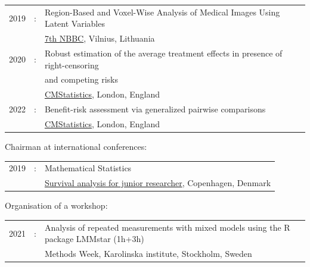 \documentclass[12pt]{article}
\begin{document}
\begin{tabular}{l@{ }l@{ }l}
2019 &:& Region-Based and Voxel-Wise Analysis of Medical Images Using Latent Variables \\
&& \href{https://events.razzby.com/nbbc19/}{7th NBBC}, Vilnius, Lithuania \\
2020 &:& Robust estimation of the average treatment effects in presence of right-censoring \\
&& and competing risks \\
&& \href{http://www.cmstatistics.org/conferences.php}{CMStatistics}, London, England \\
2022 &:&  	Benefit-risk assessment via generalized pairwise comparisons  \\
&& \href{http://www.cmstatistics.org/CMStatistics2022/programme.php}{CMStatistics}, London, England \\
\end{tabular}

\bigskip

Chairman at international conferences:

\medskip

\begin{tabular}{l@{ }l@{ }l}
2019 &:& Mathematical Statistics \\
&& \href{https://publicifsv.sund.ku.dk/~safjr2019/}{Survival analysis for junior researcher}, Copenhagen, Denmark
\end{tabular}

\bigskip

Organisation of a workshop:
\begin{tabular}{l@{ }l@{ }l}
2021 &:& Analysis of repeated measurements with mixed models using the R package LMMstar (1h+3h) \\
&& Methods Week, Karolinska institute, Stockholm, Sweden
\end{tabular}



\end{document}
